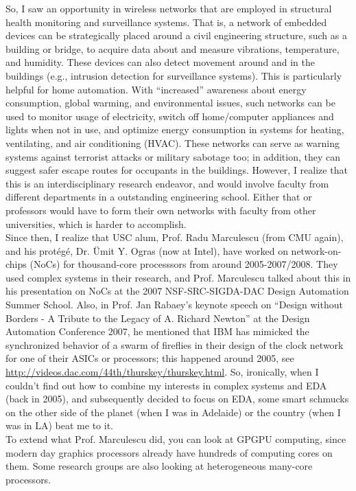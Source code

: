 So, I saw an opportunity in wireless networks that are employed in structural health monitoring and surveillance systems. That is, a network of embedded devices can be strategically placed around a civil engineering structure, such as a building or bridge, to acquire data about and measure vibrations, temperature, and humidity. These devices can also detect movement around and in the buildings (e.g., intrusion detection for surveillance systems). This is particularly helpful for home automation. With ``increased'' awareness about energy consumption, global warming, and environmental issues, such networks can be used to monitor usage of electricity, switch off home/computer appliances and lights when not in use, and optimize energy consumption in systems for heating, ventilating, and air conditioning (HVAC). These networks can serve as warning systems against terrorist attacks or military sabotage too; in addition, they can suggest safer escape routes for occupants in the buildings. However, I realize that this is an interdisciplinary research endeavor, and would involve faculty from different departments in a outstanding engineering school. Either that or professors would have to form their own networks with faculty from other universities, which is harder to accomplish. \\

Since then, I realize that USC alum, Prof. Radu Marculescu (from CMU again), and his prot{\'{e}}g{\'{e}}, Dr. {\"{U}}mit Y. Ogras (now at Intel), have worked on network-on-chips (NoCs) for thousand-core processsors from around 2005-2007/2008. They used complex systems in their research, and Prof. Marculescu talked about this in his presentation on NoCs at the 2007 NSF-SRC-SIGDA-DAC Design Automation Summer School. Also, in Prof. Jan Rabaey's keynote speech on ``Design without Borders - A Tribute to the Legacy of A. Richard Newton'' at the Design Automation Conference 2007, he mentioned that IBM has mimicked the synchronized behavior of a swarm of fireflies in their design of the clock network for one of their ASICs or processors; this happened around 2005, see \url{http://videos.dac.com/44th/thurskey/thurskey.html}. So, ironically, when I couldn't find out how to combine my interests in complex systems and EDA (back in 2005), and subsequently decided to focus on EDA, some smart schmucks on the other side of the planet (when I was in Adelaide) or the country (when I was in LA) beat me to it. \\

To extend what Prof. Marculescu did, you can look at GPGPU computing, since modern day graphics processors already have hundreds of computing cores on them. Some research groups are also looking at heterogeneous many-core processors. \\

